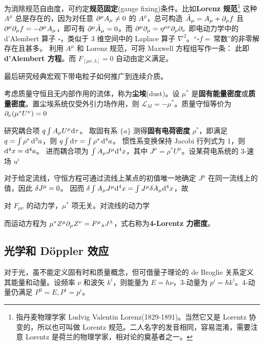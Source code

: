 为消除规范自由度，可约定\textbf{规范固定}(gauge fixing)条件。比如\textbf{Lorenz 规范}\footnote{指丹麦物理学家 Ludvig Valentin Lorenz(1829-1891)。当然它又是 Lorentz 协变的，所以也可叫做 Lorentz 规范。二人名字的发音相同，容易混淆，需要注意 Lorentz 是荷兰的物理学家，相对论的奠基者之一。}
这种 $A^\mu$ 总是存在的，因为对任意 $\partial^\mu A_\mu \ne 0$ 的 $A^\mu$，总可构造 $\tilde A_\mu = A_\mu + \partial_\mu f$ 且 $\partial^\mu\partial_\mu f=-\partial^\mu A_\mu $，即可有 $\partial^\mu \tilde A_\mu =0$。而 $\partial^\mu\partial_\mu=\eta^{\mu\nu}\partial_{\mu}\partial_{\nu}$ 即电动力学中的 d'Alembert 算子 $\square$，类似于 3 维空间中的 Laplace 算子 $\nabla^2$。“$\square f =$\,常数”的非零解存在且甚多。
利用 $A^\mu$ 和 Lorenz 规范，可将 Maxwell 方程组写作一条：
此即\textbf{d'Alembert 方程}。而 $F_{[\mu\nu,\lambda]}=0$ 自动由定义满足。

最后研究经典宏观下带电粒子如何推广到连续介质。


考虑质量守恒且无内部作用的流体，称为\textbf{尘埃}(dust)。设 $\mu^*$ 是\textbf{固有能量密度}或\textbf{质量密度}。置尘埃系统仅受外引力场作用，则 $\mathcal L_M=-\mu^*$。质量守恒等价为 $\partial_\nu(\mu^* U^\nu)=0$

研究耦合项 $q\int A_\mu U^\mu \dd\tau$。 
取固有系 $\{a\}$ 测得\textbf{固有电荷密度} $\rho^*$，即满足 $q=\int\rho^*\dd[3]{a}$，则 $q\int\dd\tau=\int\rho^*\dd[4]{a}$。
惯性系变换保持 Jacobi 行列式为 1，则 $\dd[4]x =\dd[4]{a}$。
进而耦合项为 $\int A_\mu J^\mu \dd[4]x$，其中 $J^\mu=\rho^*U^\mu$。设某荷电系统的 3-速场 $u^i$


对于给定流线，守恒⽅程可通过流线上某点的初值唯⼀地确定 $J^\mu$ 在同⼀流线上的值，因此 $\var J^\mu=0$。
因而 $\var\int A_\mu J^\mu \dd[4]x=\int J^\mu \delta A_\mu \dd[4]x$，故

对 $F_{\mu\nu}$ 的动力学，$\mu^*$ 项无关。对流线的动力学


而运动方程为 $\mu^* Z^\mu\partial_\mu Z^\nu=F^\mu{}_{\lambda}J^\lambda$，式右称为\textbf{4-Lorentz 力密度}。

\subsection{光学和 Döppler 效应}

对于光，虽不能定义固有时和质量概念，但可借量子理论的 de Broglie 关系定义其能量和动量。设频率 $\nu$ 和波矢 $k^i$，则能量为 $E=h\nu$，3-动量为 $p^i = \hbar k^i$。4-动量仍满足 $P^0=E,P^i=p^i$。

